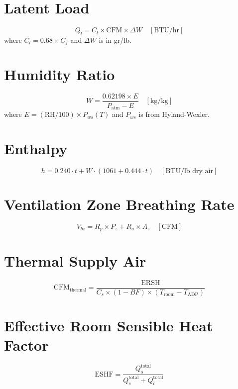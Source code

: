 \documentclass[12pt, a4paper, oneside]{report}
\begin{document}
\section{Latent Load}
\begin{equation}
  Q_l = C_l \times \text{CFM} \times \Delta W \quad [\text{BTU/hr}]
\end{equation}
where $C_l = 0.68 \times C_f$ and $\Delta W$ is in gr/lb.

\section{Humidity Ratio}
\begin{equation}
  W = \frac{0.62198 \times E}{P_{\text{atm}} - E} \quad [\text{kg/kg}]
\end{equation}
where $E = (\text{RH}/100) \times P_{ws}(T)$ and $P_{ws}$ is from Hyland-Wexler.

\section{Enthalpy}
\begin{equation}
  h = 0.240 \cdot t + W \cdot (1061 + 0.444 \cdot t) \quad [\text{BTU/lb dry air}]
\end{equation}

\section{Ventilation Zone Breathing Rate}
\begin{equation}
  V_{bz} = R_p \times P_z + R_a \times A_z \quad [\text{CFM}]
\end{equation}

\section{Thermal Supply Air}
\begin{equation}
  \text{CFM}_{\text{thermal}} = \frac{\text{ERSH}}{C_s \times (1 - BF) \times (T_{\text{room}} - T_{\text{ADP}})}
\end{equation}

\section{Effective Room Sensible Heat Factor}
\begin{equation}
  \text{ESHF} = \frac{Q_s^{\text{total}}}{Q_s^{\text{total}} + Q_l^{\text{total}}}
\end{equation}
\end{document}
